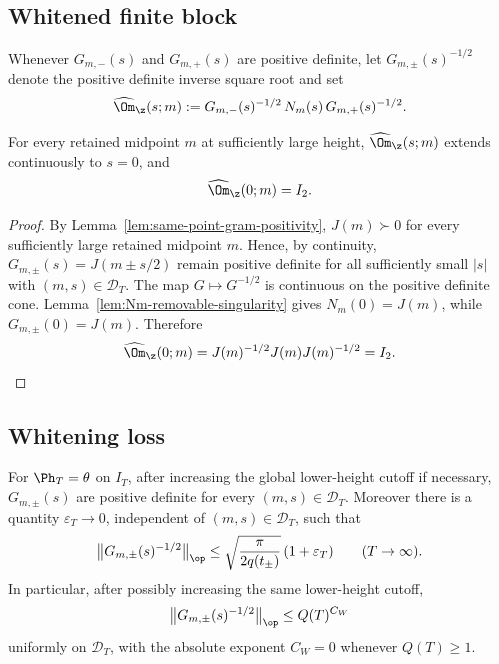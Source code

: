 \subsection{Whitened finite block}
\label{subsec:whitened-finite-block}

\begin{definition}
\label{def:whitened-finite-block}
Whenever \(G_{m,-}(s)\) and \(G_{m,+}(s)\) are positive definite, let
\(G_{m,\pm}(s)^{-1/2}\) denote the positive definite inverse square root
and set
\begin{equation}
\label{eq:omega-finite}
\widehat\Om_\z(s;m)
:= G_{m,-}(s)^{-1/2}\,N_m(s)\,G_{m,+}(s)^{-1/2}.
\end{equation}
\end{definition}

\begin{corollary}[Coalescence: \(\widehat\Om_\z(0;m)=I_2\)]
\label{cor:omega-coalescence}
For every retained midpoint \(m\) at sufficiently large height,
\(\widehat\Om_\z(s;m)\) extends continuously to \(s=0\), and
\[
        \widehat\Om_\z(0;m)=I_2.
\]
\end{corollary}

\begin{proof}
By Lemma~\ref{lem:same-point-gram-positivity}, \(J(m)\succ0\) for every
sufficiently large retained midpoint \(m\).  Hence, by continuity,
\(G_{m,\pm}(s)=J(m\pm s/2)\) remain positive definite for all sufficiently
small \(|s|\) with \((m,s)\in\mathcal D_T\).  The map
\(G\mapsto G^{-1/2}\) is continuous on the positive definite cone.
Lemma~\ref{lem:Nm-removable-singularity} gives \(N_m(0)=J(m)\), while
\(G_{m,\pm}(0)=J(m)\).  Therefore
\[
\widehat\Om_\z(0;m)
=J(m)^{-1/2}J(m)J(m)^{-1/2}=I_2.
\]
\end{proof}

\subsection{Whitening loss}
\label{subsec:whitening-loss}

\begin{lemma}
\label{lem:whitening-loss}
For \(\Ph_T=\theta\) on \(I_T\), after increasing the global lower-height
cutoff if necessary, \(G_{m,\pm}(s)\) are positive definite for every
\((m,s)\in\mathcal D_T\).  Moreover there is a quantity
\(\varepsilon_T\to0\), independent of \((m,s)\in\mathcal D_T\), such that
\begin{equation}
\label{eq:whitening-loss-bound}
        \bigl\|G_{m,\pm}(s)^{-1/2}\bigr\|_{\op}
        \le
        \sqrt{\frac{\pi}{2q(t_\pm)}}\,(1+\varepsilon_T)
        \qquad (T\to\infty).
\end{equation}
In particular, after possibly increasing the same lower-height cutoff,
\begin{equation}
\label{eq:whitening-loss-polynomial}
        \bigl\|G_{m,\pm}(s)^{-1/2}\bigr\|_{\op}
        \le Q(T)^{C_W}
\end{equation}
uniformly on \(\mathcal D_T\), with the absolute exponent \(C_W=0\)
whenever \(Q(T)\ge1\).
\end{lemma}

